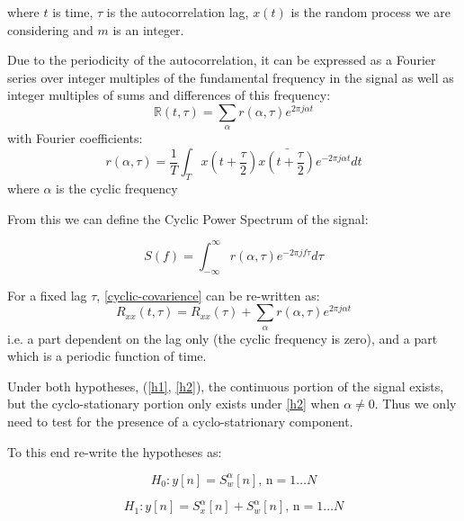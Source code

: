 \documentclass[12pt, a4paper]{article}
\newcommand*\conj[1]{\bar{#1}}
\begin{document}
where \(t\) is time, \(\tau\) is the autocorrelation lag, \(x\left(t\right)\) is the random process we are considering and \(m\) is an integer. 

Due to the periodicity of the autocorrelation, it can be expressed as a Fourier series over integer multiples of the fundamental frequency in the signal as well as integer multiples of sums and differences of this frequency:
%
\begin{equation}
\mathbb{R}\left(t, \tau\right) = \sum_{\alpha} r\left(\alpha, \tau\right) e^{2\pi j \alpha t}  
\end{equation}
\label{cyclic-covarience}
%
with Fourier coefficients:
%
\begin{equation}
r\left(\alpha, \tau\right) = \frac{1}{T} \int_{T} x\left(t+\frac{\tau}{2}\right)\conj{x\left(t+\frac{\tau}{2}\right)} e^{-2\pi j \alpha t} dt
\end{equation}
%
where \(\alpha\) is the cyclic frequency

From this we can define the Cyclic Power Spectrum of the signal:

\begin{equation}
S\left(f\right) = \int_{-\infty}^{\infty} r\left(\alpha, \tau\right) e^{-2 \pi j f \tau} d\tau
\end{equation}

For a fixed lag \(\tau\), \ref{cyclic-covarience} can be re-written as:
%
\begin{equation}
R_{xx}\left(t, \tau \right) = R_{xx}\left(\tau\right) + \sum_{\alpha} r\left(\alpha, \tau\right) e^{2\pi j \alpha t}  
\end{equation}
%
i.e. a part dependent on the lag only (the cyclic frequency is zero), and a part which is a periodic function of time. 

Under both hypotheses, (\ref{h1}, \ref{h2}), the continuous portion of the signal exists, but the cyclo-stationary portion only exists under \ref{h2} when \(\alpha \neq 0\). Thus we only need to test for the presence of a cyclo-statrionary component. 

To this end re-write the hypotheses as:

\begin{equation}
H_{0}: y\left[n\right] = S_{w}^\alpha \left[n\right] \text{, n} =  1 \ldots N 
\end{equation}
\label{c1}

\begin{equation}
H_{1}: y\left[n \right] = S_{x}^{\alpha} \left[n\right] + S_{w}^{\alpha} \left[n\right] \text{, n} =  1 \ldots N 
\end{equation}
\label{c2}
\end{document}
